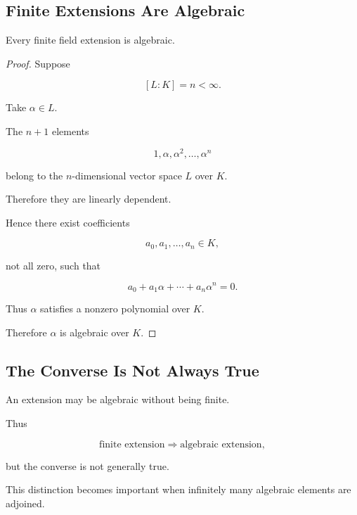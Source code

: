 \subsection{Finite Extensions Are Algebraic}
\label{subsec:finite-extensions-algebraic}

\begin{theorem}
Every finite field extension is algebraic.
\end{theorem}

\begin{proof}
Suppose

\[ [L:K]=n<\infty. \]

Take \(\alpha\in L\).

The \(n+1\) elements

\[ 1,\alpha,\alpha^2,\ldots,\alpha^n \]

belong to the \(n\)-dimensional vector space \(L\) over \(K\).

Therefore they are linearly dependent.

Hence there exist coefficients

\[ a_0,a_1,\ldots,a_n\in K, \]

not all zero, such that

\[ a_0+a_1\alpha+\cdots+a_n\alpha^n=0. \]

Thus \(\alpha\) satisfies a nonzero polynomial over \(K\).

Therefore \(\alpha\) is algebraic over \(K\).
\end{proof}

\subsection{The Converse Is Not Always True}
\label{subsec:algebraic-not-finite}

An extension may be algebraic without being finite.

Thus

\[ \text{finite extension}\Longrightarrow\text{algebraic extension}, \]

but the converse is not generally true.

This distinction becomes important when infinitely many algebraic elements
are adjoined.

